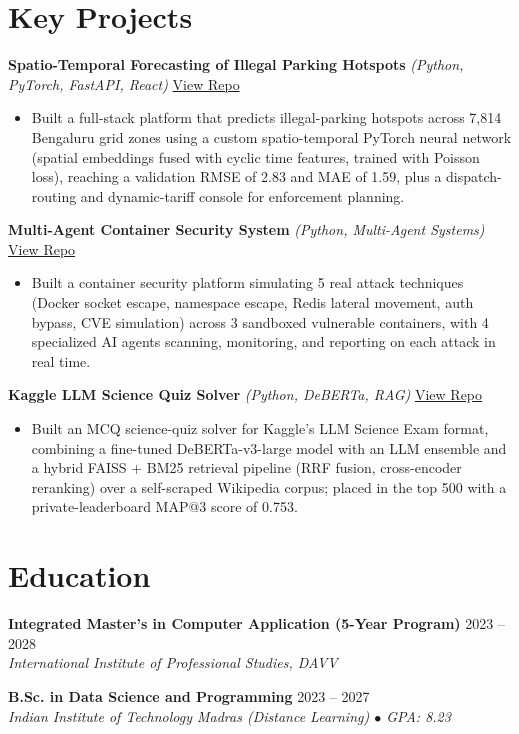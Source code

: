 \documentclass[10pt,letterpaper]{article}
\newcommand{\role}[3]{\textbf{#1} \hfill #3\\ \textit{#2}\par}
\newcommand{\project}[3]{\textbf{#1} \textit{(#2)} \hfill \href{#3}{View Repo}\par}
\begin{document}
\section*{Key Projects}
\project{Spatio-Temporal Forecasting of Illegal Parking Hotspots}{Python, PyTorch, FastAPI, React}{https://github.com/23f2005639/parking_violation_system}
\begin{itemize}
  \item Built a full-stack platform that predicts illegal-parking hotspots across 7,814 Bengaluru grid zones using a custom spatio-temporal PyTorch
  neural network (spatial embeddings fused with cyclic time features, trained with Poisson loss), reaching a validation RMSE of 2.83 and MAE of 1.59,
  plus a dispatch-routing and dynamic-tariff console for enforcement planning.
\end{itemize}
\project{Multi-Agent Container Security System}{Python, Multi-Agent Systems}{https://github.com/23f2005639/Docker_Security_Agent}
\begin{itemize}
  \item Built a container security platform simulating 5 real attack techniques (Docker socket escape, namespace escape, Redis lateral movement,
  auth bypass, CVE simulation) across 3 sandboxed vulnerable containers, with 4 specialized AI agents scanning, monitoring, and reporting on each
  attack in real time.
\end{itemize}
\project{Kaggle LLM Science Quiz Solver}{Python, DeBERTa, RAG}{https://github.com/23f2005639/dlgen_ai_quiz_solver}
\begin{itemize}
  \item Built an MCQ science-quiz solver for Kaggle's LLM Science Exam format, combining a fine-tuned DeBERTa-v3-large model with an LLM ensemble
  and a hybrid FAISS + BM25 retrieval pipeline (RRF fusion, cross-encoder reranking) over a self-scraped Wikipedia corpus; placed in the top 500
  with a private-leaderboard MAP@3 score of 0.753.
\end{itemize}

\section*{Education}
\role{Integrated Master's in Computer Application (5-Year Program)}{International Institute of Professional Studies, DAVV}{2023 -- 2028}
\vspace{3pt}
\role{B.Sc. in Data Science and Programming}{Indian Institute of Technology Madras (Distance Learning) $\bullet$ GPA: 8.23}{2023 -- 2027}
\end{document}
